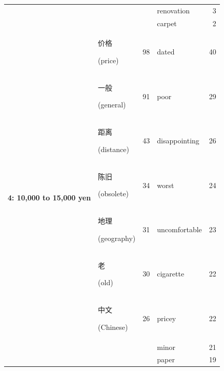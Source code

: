 \documentclass[smallextended,natbib]{svjour3}       %
\begin{document}
\begin{table}[ht]
{\begin{tabular}{|c|lr|lr|}
                                                             &                                                &      & renovation     & 3   \\  
                                                             &                                                &      & carpet         & 2   \\ \hline
        \multirow{10}{*}{\textbf{4: 10,000 to 15,000 yen}}   & \begin{CJK}{UTF8}{gbsn}价格\end{CJK} (price)     & 98   & dated          & 40  \\  
                                                             & \begin{CJK}{UTF8}{gbsn}一般\end{CJK} (general)   & 91   & poor           & 29  \\  
                                                             & \begin{CJK}{UTF8}{gbsn}距离\end{CJK} (distance)  & 43   & disappointing  & 26  \\  
                                                             & \begin{CJK}{UTF8}{gbsn}陈旧\end{CJK} (obsolete)  & 34   & worst          & 24  \\  
                                                             & \begin{CJK}{UTF8}{gbsn}地理\end{CJK} (geography) & 31   & uncomfortable  & 23  \\  
                                                             & \begin{CJK}{UTF8}{gbsn}老\end{CJK} (old)        & 30   & cigarette      & 22  \\  
                                                             & \begin{CJK}{UTF8}{gbsn}中文\end{CJK} (Chinese)   & 26   & pricey         & 22  \\  
                                                             &                                                &      & minor          & 21  \\  
                                                             &                                                &      & paper          & 19  \\  

\end{tabular}}
\end{table}
\end{document}
